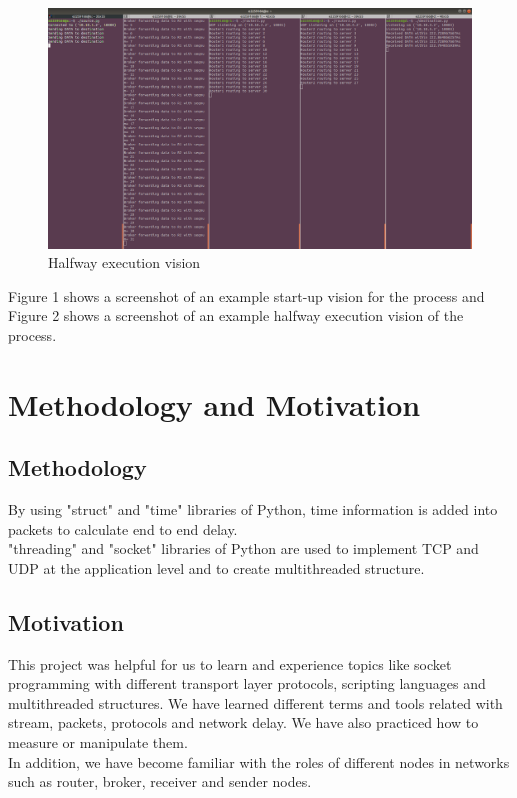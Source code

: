 \documentclass[conference]{IEEEtran}
\begin{document}
\begin{figure}
    \centering
    \includegraphics[scale=0.14]{halfway_execution.png}
    \caption{Halfway execution vision}
\end{figure}

Figure 1 shows a screenshot of an example start-up vision for the process and Figure 2 shows a screenshot of an example halfway execution vision of the process. 

\section{Methodology and Motivation}
\subsection{Methodology}
By using "struct" and "time" libraries of Python, time information is added into packets to calculate end to end delay. \\
"threading" and "socket" libraries of Python are used to implement TCP and UDP at the application level and to create multithreaded structure. 

\subsection{Motivation}
This project was helpful for us to learn and experience topics like socket programming with different transport layer protocols, scripting languages and multithreaded structures. We have learned different terms and tools related with stream, packets, protocols and network delay. We have also practiced how to measure or manipulate them. \\

In addition, we have become familiar with the roles of different nodes in networks such as router, broker, receiver and sender nodes. \\
\end{document}
